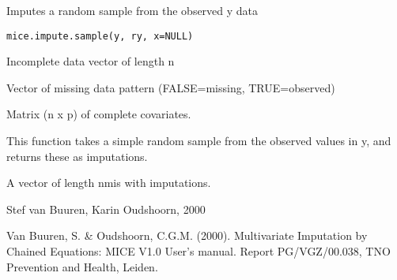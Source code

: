 \documentclass{article}
\begin{document}
\begin{Description}\relax
Imputes a random sample from the observed y data
\end{Description}
\begin{Usage}
\begin{verbatim}
mice.impute.sample(y, ry, x=NULL)
\end{verbatim}
\end{Usage}
\begin{Arguments}
\begin{ldescription}
\item[\code{y}] Incomplete data vector of length n
\item[\code{ry}] Vector of missing data pattern (FALSE=missing, TRUE=observed)
\item[\code{x}] Matrix (n x p) of complete covariates.
\end{ldescription}
\end{Arguments}
\begin{Details}\relax
This function takes a simple random sample from the observed values in
y, and returns these as imputations.
\end{Details}
\begin{Value}
A vector of length nmis with imputations.
\end{Value}
\begin{Author}\relax
Stef van Buuren, Karin Oudshoorn, 2000
\end{Author}
\begin{References}\relax
Van Buuren, S. \& Oudshoorn, C.G.M. (2000). Multivariate Imputation by Chained Equations: 
MICE V1.0 User's manual. Report PG/VGZ/00.038, TNO Prevention and Health, Leiden.
\end{References}
\end{document}
